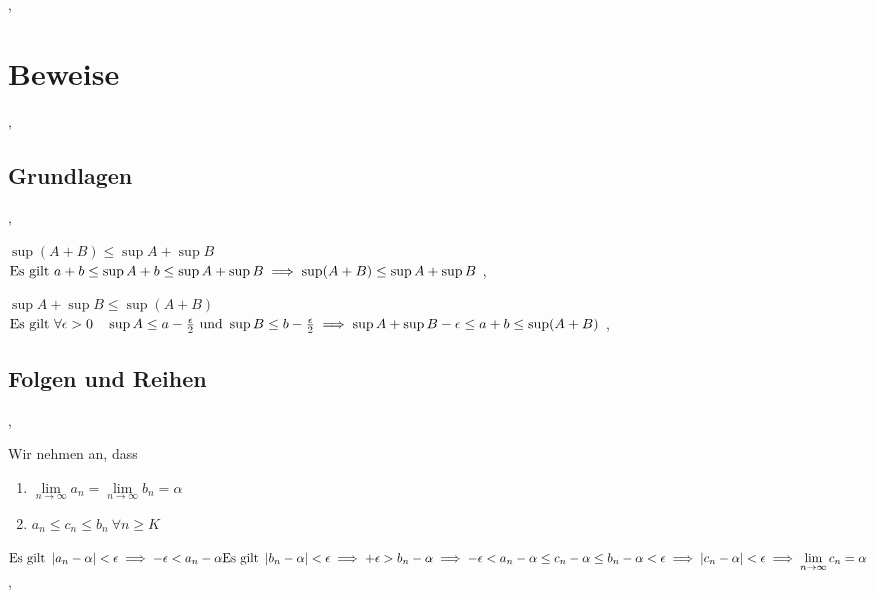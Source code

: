 \sep

\section{Beweise}
\sep
\subsection{Grundlagen}
\sep

\Beweis $\sup (A + B) \leq \sup A + \sup B$ \\
\(
\text{Es gilt } a + b \leq \sup A + b \leq \sup A + \sup B \\
\implies \sup (A + B) \leq \sup A + \sup B
\)
\sep

\Beweis $\sup A + \sup B \leq \sup(A + B)$  \\
\(
\text{Es gilt } \forall \epsilon > 0 \quad \sup A \leq a -  \frac{\epsilon}{2} \text{ und } \sup B \leq b -  \frac{\epsilon}{2} \\
\implies \sup A + \sup B - \epsilon \leq a + b \leq \sup (A + B) 
\)
\sep

\subsection{Folgen und Reihen}
\sep

 Wir nehmen an, dass 
\begin{enumerate}
\item $\lim\limits_{n \rightarrow \infty} a_{n} = \lim\limits_{n \rightarrow \infty} b_{n} = \alpha$ 
\item $a_{n} \leq c_{n} \leq b_{n} \ \forall n \geq K$
\end{enumerate}

\(
\text{Es gilt } \left\lvert a_n - \alpha \right\rvert < \epsilon \implies - \epsilon < a_n - \alpha \\
\text{Es gilt } \left\lvert b_n - \alpha \right\rvert < \epsilon \implies + \epsilon > b_n - \alpha \\
\implies - \epsilon < a_n - \alpha \leq c_n - \alpha \leq b_n - \alpha < \epsilon \\
\implies \left\lvert c_n - \alpha \right\rvert < \epsilon \implies \lim\limits_{n \rightarrow \infty} c_{n} = \alpha
\)
\sep
